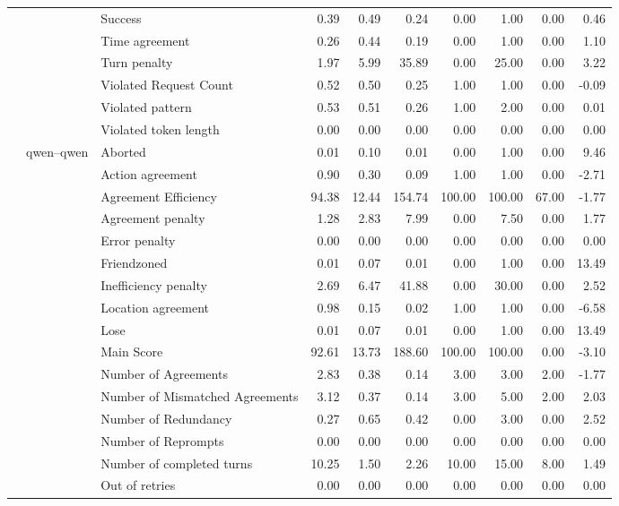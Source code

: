 \begin{tabular}{lllrrrrrrr}
 &  & Success & 0.39 & 0.49 & 0.24 & 0.00 & 1.00 & 0.00 & 0.46 \\
 &  & Time agreement & 0.26 & 0.44 & 0.19 & 0.00 & 1.00 & 0.00 & 1.10 \\
 &  & Turn penalty & 1.97 & 5.99 & 35.89 & 0.00 & 25.00 & 0.00 & 3.22 \\
 &  & Violated Request Count & 0.52 & 0.50 & 0.25 & 1.00 & 1.00 & 0.00 & -0.09 \\
 &  & Violated pattern & 0.53 & 0.51 & 0.26 & 1.00 & 2.00 & 0.00 & 0.01 \\
 &  & Violated token length & 0.00 & 0.00 & 0.00 & 0.00 & 0.00 & 0.00 & 0.00 \\
\cline{2-10}
 & \multirow[t]{27}{*}{qwen--qwen} & Aborted & 0.01 & 0.10 & 0.01 & 0.00 & 1.00 & 0.00 & 9.46 \\
 &  & Action agreement & 0.90 & 0.30 & 0.09 & 1.00 & 1.00 & 0.00 & -2.71 \\
 &  & Agreement Efficiency & 94.38 & 12.44 & 154.74 & 100.00 & 100.00 & 67.00 & -1.77 \\
 &  & Agreement penalty & 1.28 & 2.83 & 7.99 & 0.00 & 7.50 & 0.00 & 1.77 \\
 &  & Error penalty & 0.00 & 0.00 & 0.00 & 0.00 & 0.00 & 0.00 & 0.00 \\
 &  & Friendzoned & 0.01 & 0.07 & 0.01 & 0.00 & 1.00 & 0.00 & 13.49 \\
 &  & Inefficiency penalty & 2.69 & 6.47 & 41.88 & 0.00 & 30.00 & 0.00 & 2.52 \\
 &  & Location agreement & 0.98 & 0.15 & 0.02 & 1.00 & 1.00 & 0.00 & -6.58 \\
 &  & Lose & 0.01 & 0.07 & 0.01 & 0.00 & 1.00 & 0.00 & 13.49 \\
 &  & Main Score & 92.61 & 13.73 & 188.60 & 100.00 & 100.00 & 0.00 & -3.10 \\
 &  & Number of Agreements & 2.83 & 0.38 & 0.14 & 3.00 & 3.00 & 2.00 & -1.77 \\
 &  & Number of Mismatched Agreements & 3.12 & 0.37 & 0.14 & 3.00 & 5.00 & 2.00 & 2.03 \\
 &  & Number of Redundancy & 0.27 & 0.65 & 0.42 & 0.00 & 3.00 & 0.00 & 2.52 \\
 &  & Number of Reprompts & 0.00 & 0.00 & 0.00 & 0.00 & 0.00 & 0.00 & 0.00 \\
 &  & Number of completed turns & 10.25 & 1.50 & 2.26 & 10.00 & 15.00 & 8.00 & 1.49 \\
 &  & Out of retries & 0.00 & 0.00 & 0.00 & 0.00 & 0.00 & 0.00 & 0.00 \\

\end{tabular}
